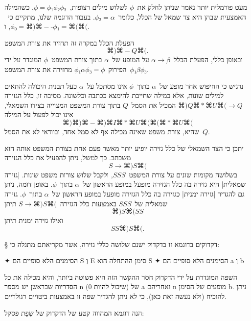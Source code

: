 מעט פורמלית יותר נאמר שניתן לחלק את~$ϕ$ לשלוש מילים רצופות,~$ϕ=ϕ₁ϕ₂ϕ₃$, כשהמילה
האמצעית שבהן היא צד שמאל של הכלל, כלומר~$ϕ₂=α$. בעבור הדוגמה שלנו, מתקיים
כי~$ϕ₀=⌘)⌘-$, ו-$ϕ₁=⌘(⌘($.

הפעלת הכלל
במקרה זה תחזיר את צורת המשפט
\begin{equation*}
⌘)⌘-Q⌘(.
\end{equation*}
ובאופן כללי, הפעלת הכלל~$α→β$ על המופע של~$α$ בתוך צורת המשפט~$ϕ$ המוגדר על ידי
הפירוק~$ϕ₁αϕ₃=ϕ$ מחזירה את צורת המשפט~$ϕ₁βϕ₃$.

נדגיש כי החיפוש אחר מופע של~$α$ בתוך~$ϕ$ אינו מסתכל על~$α$ כעל תבנית היכולה
להתאים למילים שונות, אלא כמילה שחייבת להימצא ככתבה וכלשונה. מסיבה זו, כלל
הגזירה
$⌘)Q⌘*⌘U⌘(→Q$ המכיל את הסמל~$Q$ בתוך צורת המשפט המצוייה בצידו השמאלי,
אינו יכול לפעול על המילה
\begin{equation*}
⌘)⌘)⌘-⌘)⌘I⌘*⌘U ⌘(⌘(⌘*⌘U⌘(
\end{equation*}
שהיא, צורת משפט שאינה מכילה אף לא סמל אחד, ובוודאי לא את הסמל~$Q$.

יתכן כי הצד השמאלי של כלל גזירה יופיע יותר מאשר פעם אחת בצורת
המשפט אותה הוא משכתב. כך למשל, ניתן להפעיל את כלל הגזירה
\begin{equation}
  \label{eq:parenthesis:rewrite}
  S→⌘) S ⌘(
\end{equation}
בשלושה מקומות שונים על צורת המשפט~$SSS$, ולקבל שלוש צורות משפט שונות.
\ע|גזירה שמאלית| היא גזירה בה כלל הגזירה מופעל במופע הראשון של~$α$ בתוך~$ϕ$.
באופן דומה, ניתן גם להגדיר \ע|גזירה ימנית| כגזירה בה כלל הגזירה מופעל במופע
הראשון של~$α$ בתוך~$ϕ$. גזירה שמאלית של~$SSS$ באמצעות כלל הגזירה~$S→⌘)S⌘($ תיתן
\begin{equation*}
  ⌘)S⌘(SS
\end{equation*}
ואילו גזירה ימנית תיתן
\begin{equation*}
  SS ⌘) S ⌘(.
\end{equation*}

§ דקדוקים
בדוגמא זו בדקדוק ישנם שלושה כללי גזירה, אשר מקריאתם מתגלה כי:
\begin{enumerate}
✦
הסימנים הלא סופיים הם S וְ E
סימן ההתחלה הוא S
✦
הסימנים הלא סופיים הם a וְ b
\end{enumerate}

השפה המוגדרת על ידי הדקדוק חסר ההקשר הזה היא פשוטה ביותר, והיא מכילה את
כל הסדריות שבראשן יש מספר n (שיכול להיות 0) של a ואחריהם n מופעים של
הסימן b.
ניתן להוכיח (ולא נעשה זאת כאן), כי לא ניתן להגדיר שפה זו באמצעות ביטויים
רגולריים.

הנה דוגמא המהווה קטע של הדקדוק של שְׂפַת פסקל:

